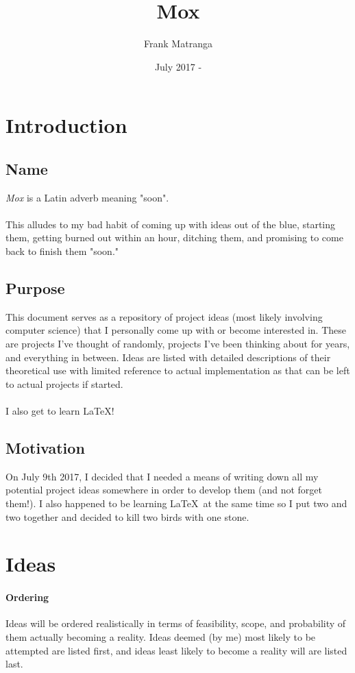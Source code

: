 \documentclass{article}[2017/07/09]
\title{Mox}
\author{Frank Matranga}
\date{July 2017 - }
\begin{document}
  \maketitle
  \newpage

  \tableofcontents
  \newpage

  \section{Introduction}
  \subsection{Name}
    \emph{Mox} is a Latin adverb meaning "soon".\\\\
    This alludes to my bad habit of coming up with ideas out of the blue, starting them, getting burned out within an hour, ditching them, and promising to come back to finish them "soon."
  \subsection{Purpose}
    This document serves as a repository of project ideas (most likely involving computer science) that I personally come up with or become interested in.
    These are projects I've thought of randomly, projects I've been thinking about for years, and everything in between.
    Ideas are listed with detailed descriptions of their theoretical use with limited reference to actual implementation as that can be left to actual projects if started.\\\\
    I also get to learn \LaTeX!
  \subsection{Motivation}
    On July 9th 2017, I decided that I needed a means of writing down all my potential project ideas somewhere in order to develop them (and not forget them!).
    I also happened to be learning \LaTeX\  at the same time so I put two and two together and decided to kill two birds with one stone.

  \section{Ideas}
  \paragraph{Ordering}
    Ideas will be ordered realistically in terms of feasibility, scope, and probability of them actually becoming a reality. Ideas deemed (by me) most likely to be attempted are listed first, and ideas least likely to become a reality will are listed last.
\end{document}
